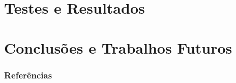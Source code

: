 	\section{Testes e Resultados}
		
%		
%		
			
		
	\section{Conclusões e Trabalhos Futuros}
		
	
	\begin{frame}[allowframebreaks]
		\frametitle{Referências}
		
	\end{frame}
	
